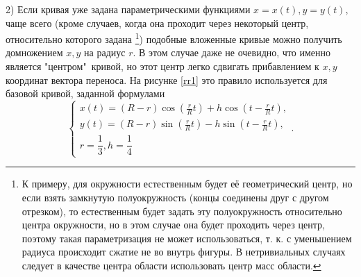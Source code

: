 \documentclass[a4paper]{article}
\begin{document}
  2) Если кривая уже задана параметрическими функциями $x=x(t),y=y(t)$,
        чаще всего (кроме случаев, когда она проходит через некоторый центр,
        относительно которого задана \footnote{К примеру, для окружности естественным будет её геометрический центр, но если взять замкнутую полуокружность (концы соединены друг с другом отрезком), то естественным будет задать эту полуокружность относительно центра окружности, но в этом случае она будет проходить через центр, поэтому такая параметризация не может использоваться, т. к. с уменьшением радиуса происходит сжатие не во внутрь фигуры. В нетривиальных случаях следует в качестве центра области использовать центр масс области.}) подобные вложенные кривые можно получить домножением $x,y$ на радиус $r$.
        В этом случае даже не очевидно, что именно является "центром"\ кривой, но этот центр легко сдвигать прибавлением к $x,y$ координат вектора переноса.
        На рисунке \ref{rr1} это правило используется для базовой кривой, заданной формулами
        \[
          \begin{cases}
            x(t)=(R-r)\cos\left(\frac{r}{R}t\right)+h \cos \left(t-\frac{r}{R}t\right), \\
            y(t)=(R-r)\sin\left(\frac{r}{R}t\right)-h \sin \left(t-\frac{r}{R}t\right), \\
            r=\dfrac{1}{3}, h=\dfrac{1}{4}
          \end{cases}.
        \]
\end{document}

